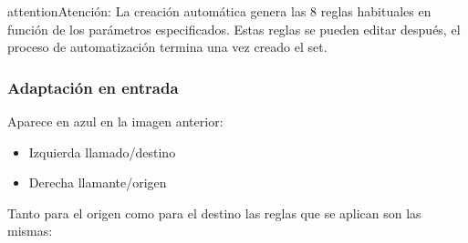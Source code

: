 \documentclass[letterpaper,10pt,spanish]{sphinxmanual}
\begin{document}
\begin{notice}{attention}{Atención:}
La creación automática genera las 8 reglas habituales en función de los parámetros especificados. Estas reglas se pueden editar después, el proceso de automatización termina una vez creado el set.
\end{notice}


\subsubsection{Adaptación en entrada}
\label{external_incoming_calls/numeric_transformations:id1}
Aparece en azul en la imagen anterior:
\begin{itemize}
\item {} 
Izquierda llamado/destino

\item {} 
Derecha llamante/origen

\end{itemize}

Tanto para el origen como para el destino las reglas que se aplican son las mismas:
\end{document}
